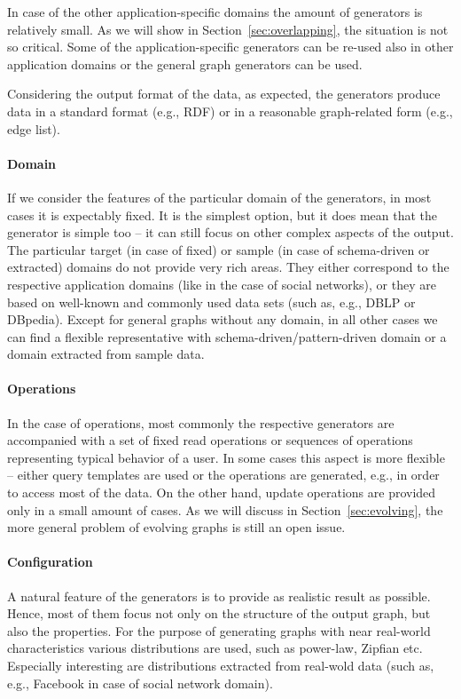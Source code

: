 In case of the other application-specific domains the amount of generators is relatively small. As we will show in Section~\ref{sec:overlapping}, the situation is not so critical. Some of the application-specific generators can be re-used also in other application domains or the general graph generators can be used.

Considering the output format of the data, as expected, the generators produce data in a standard format (e.g., RDF) or in a reasonable graph-related form (e.g., edge list).

\paragraph{Domain}

If we consider the features of the particular domain of the generators, in most cases it is expectably fixed. It is the simplest option, but it does mean that the generator is simple too -- it can still focus on other complex aspects of the output. The particular target (in case of fixed) or sample (in case of schema-driven or extracted) domains do not provide very rich areas. They either correspond to the respective application domains (like in the case of social networks), or they are based on well-known and commonly used data sets (such as, e.g., DBLP or DBpedia). Except for general graphs without any domain, in all other cases we can find a flexible representative with schema-driven/pattern-driven domain or a domain extracted from sample data.


\paragraph{Operations}
In the case of operations, most commonly the respective generators are accompanied with a set of fixed read operations or sequences of operations representing typical behavior of a user. In some cases this aspect is more flexible -- either query templates are used or the operations are generated, e.g., in order to access most of the data. On the other hand, update operations are provided only in a small amount of cases. As we will discuss in Section~\ref{sec:evolving}, the more general problem of evolving graphs is still an open issue.

\paragraph{Configuration}
A natural feature of the generators is to provide as realistic result as possible. Hence, most of them focus not only on the structure of the output graph, but also the properties. For the purpose of generating graphs with near real-world characteristics various distributions are used, such as power-law, Zipfian etc. Especially interesting are distributions extracted from real-wold data (such as, e.g., Facebook in case of social network domain).

